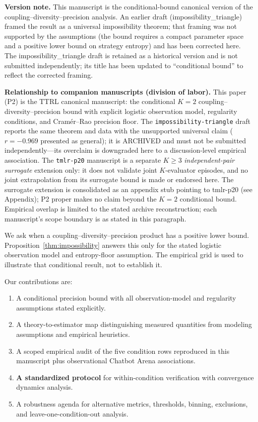 \documentclass[11pt]{article}
\begin{document}
\textbf{Version note.} This manuscript is the conditional-bound canonical version of the coupling--diversity--precision analysis. An earlier draft (impossibility\_triangle) framed the result as a universal impossibility theorem; that framing was not supported by the assumptions (the bound requires a compact parameter space and a positive lower bound on strategy entropy) and has been corrected here. The impossibility\_triangle draft is retained as a historical version and is not submitted independently; its title has been updated to ``conditional bound'' to reflect the corrected framing.

\textbf{Relationship to companion manuscripts (division of labor).} This paper (P2) is the TTRL canonical manuscript: the conditional $K{=}2$ coupling--diversity--precision bound with explicit logistic observation model, regularity conditions, and Cram\'er--Rao precision floor. The \texttt{impossibility-triangle} draft reports the same theorem and data with the unsupported universal claim ($r{=}-0.969$ presented as general); it is ARCHIVED and must not be submitted independently---its overclaim is downgraded here to a discussion-level empirical association. The \texttt{tmlr-p20} manuscript is a separate $K{\geq}3$ \emph{independent-pair surrogate} extension only: it does not validate joint $K$-evaluator episodes, and no joint extrapolation from its surrogate bound is made or endorsed here. The surrogate extension is consolidated as an appendix stub pointing to tmlr-p20 (see Appendix); P2 proper makes no claim beyond the $K{=}2$ conditional bound. Empirical overlap is limited to the stated archive reconstruction; each manuscript's scope boundary is as stated in this paragraph.

We ask when a coupling--diversity--precision product has a positive lower bound. Proposition~\ref{thm:impossibility} answers this only for the stated logistic observation model and entropy-floor assumption. The empirical grid is used to illustrate that conditional result, not to establish it.

Our contributions are:
\begin{enumerate}[leftmargin=*,nosep]
 \item A conditional precision bound with all observation-model and regularity assumptions stated explicitly.
 \item A theory-to-estimator map distinguishing measured quantities from modeling assumptions and empirical heuristics.
 \item A scoped empirical audit of the five condition rows reproduced in this manuscript plus observational Chatbot Arena associations.
 \item \textbf{A standardized protocol} for within-condition verification with convergence dynamics analysis.
 \item A robustness agenda for alternative metrics, thresholds, binning, exclusions, and leave-one-condition-out analysis.
\end{enumerate}
\end{document}
